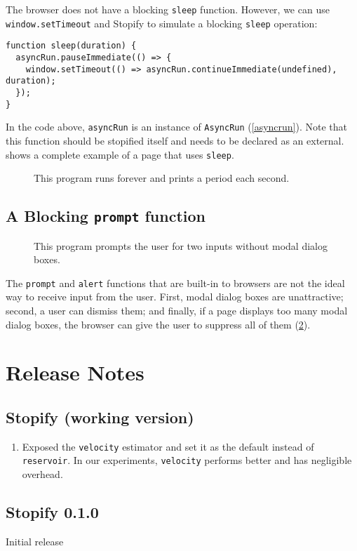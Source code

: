 \documentclass[10pt]{book}
\begin{document}
The browser does not have a blocking \lstinline|sleep| function.
However, we can use \lstinline|window.setTimeout| and Stopify to simulate
a blocking \lstinline|sleep| operation:
\begin{lstlisting}
function sleep(duration) {
  asyncRun.pauseImmediate(() => {
    window.setTimeout(() => asyncRun.continueImmediate(undefined), duration);
  });
}
\end{lstlisting}

In the code above, \lstinline|asyncRun| is an instance of \lstinline|AsyncRun|
(\cref{asyncrun}). Note that this function should be stopified itself and
needs to be declared as an external.  shows a complete example
of a page that uses \lstinline|sleep|.

\begin{figure}

\caption{This program runs forever and prints a period each second.}
\label{sleep-complete}
\end{figure}

\section{A Blocking \texttt{prompt} function}

\begin{figure}

\caption{This program prompts the user for two inputs without modal dialog boxes.}
\label{prompt-complete}
\end{figure}

The \lstinline|prompt| and \lstinline|alert| functions that are built-in to
browsers are not the ideal way to receive input from the user. First, modal
dialog boxes are unattractive; second, a user can dismiss them; and finally, if
a page displays too many modal dialog boxes, the browser can give the user to
suppress all of them (\cref{prompt-complete}).

\appendix

\chapter{Release Notes}

\section{Stopify (working version)}

\begin{enumerate}

  \item Exposed the \texttt{velocity} estimator and set it as the default
  instead of \texttt{reservoir}. In our experiments, \texttt{velocity} performs
  better and has negligible overhead.

\end{enumerate}

\section{Stopify 0.1.0}

Initial release
\end{document}

